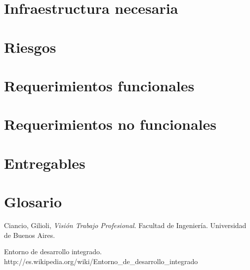 \documentclass[12pt,a4paper]{article}
\begin{document}
	
	\section{Infraestructura necesaria}
	\section{Riesgos}
	\section{Requerimientos funcionales}
	\section{Requerimientos no funcionales}
	\section{Entregables}
	\section{Glosario}

\newpage
\begin{thebibliography}{9}
	Ciancio, Gilioli,
	\emph{Visión Trabajo Profesional}.
	Facultad de Ingeniería.
	Universidad de Buenos Aires. 

	Entorno de desarrollo integrado. \\
	http://es.wikipedia.org/wiki/Entorno\_de\_desarrollo\_integrado

\end{thebibliography}
\end{document}
